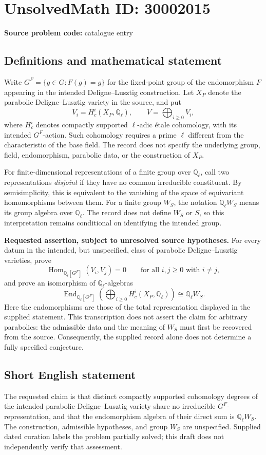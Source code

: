 \documentclass[11pt]{article}
\begin{document}
\section*{UnsolvedMath ID: 30002015}
\textbf{Source problem code:} catalogue entry
\subsection{Definitions and mathematical statement}
Write \(G^F=\{g\in G:F(g)=g\}\) for the fixed-point group of the endomorphism \(F\) appearing in the intended Deligne--Lusztig construction. Let \(X_P\) denote the parabolic Deligne--Lusztig variety in the source, and put
\[
V_i=H_c^i(X_P,\mathbb Q_\ell),\qquad V=\bigoplus_{i\geq 0}V_i,
\]
where \(H_c^i\) denotes compactly supported \(\ell\)-adic étale cohomology, with its intended \(G^F\)-action. Such cohomology requires a prime \(\ell\) different from the characteristic of the base field. The record does not specify the underlying group, field, endomorphism, parabolic data, or the construction of \(X_P\).

For finite-dimensional representations of a finite group over \(\mathbb Q_\ell\), call two representations \emph{disjoint} if they have no common irreducible constituent. By semisimplicity, this is equivalent to the vanishing of the space of equivariant homomorphisms between them. For a finite group \(W_S\), the notation \(\mathbb Q_\ell W_S\) means its group algebra over \(\mathbb Q_\ell\). The record does not define \(W_S\) or \(S\), so this interpretation remains conditional on identifying the intended group.

\textbf{Requested assertion, subject to unresolved source hypotheses.} For every datum in the intended, but unspecified, class of parabolic Deligne--Lusztig varieties, prove
\[
\operatorname{Hom}_{\mathbb Q_\ell[G^F]}(V_i,V_j)=0
\qquad\text{for all }i,j\geq 0\text{ with }i\ne j,
\]
and prove an isomorphism of \(\mathbb Q_\ell\)-algebras
\[
\operatorname{End}_{\mathbb Q_\ell[G^F]}\!\left(\bigoplus_{i\geq 0}H_c^i(X_P,\mathbb Q_\ell)\right)
\cong \mathbb Q_\ell W_S.
\]
Here the endomorphisms are those of the total representation displayed in the supplied statement. This transcription does not assert the claim for arbitrary parabolics: the admissible data and the meaning of \(W_S\) must first be recovered from the source. Consequently, the supplied record alone does not determine a fully specified conjecture.
\subsection{Short English statement}
The requested claim is that distinct compactly supported cohomology degrees of the intended parabolic Deligne--Lusztig variety share no irreducible \(G^F\)-representation, and that the endomorphism algebra of their direct sum is \(\mathbb Q_\ell W_S\). The construction, admissible hypotheses, and group \(W_S\) are unspecified. Supplied dated curation labels the problem partially solved; this draft does not independently verify that assessment.
\end{document}
